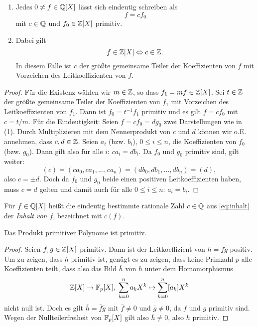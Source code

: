 \documentclass{book}
\begin{document}
\begin{lem}
    \label{lem:inhalt}
    \begin{enumerate}
        \item Jedes $0 \ne f \in \mathbb{Q}[X]$ lässt sich eindeutig schreiben als
                \begin{equation}
                    \label{eq:inhalt}
                    f = c f_0
                \end{equation}
            mit $c \in \mathbb{Q}$ und $f_0 \in \mathbb{Z}[X]$ primitiv. 
        \item Dabei gilt
            \[
                f \in \mathbb{Z}[X] \Leftrightarrow c \in \mathbb{Z}. 
            \]
            In diesem Falle ist $c$ der größte gemeinsame Teiler der
            Koeffizienten von $f$ mit Vorzeichen des Leitkoeffizienten von $f$.
    \end{enumerate}
\end{lem}
\begin{proof}
    Für die Existenz wählen wir $m \in \mathbb{Z}$, so dass $f_1 = m f \in \mathbb{Z}[X]$. Sei
    $t \in \mathbb{Z}$ der größte gemeinsame Teiler der Koeffizienten von $f_1$ mit
    Vorzeichen des Leitkoeffizienten von $f_1$. Dann ist $f_0 = t^{-1} f_1$
    primitiv und es gilt $f = c f_0$ mit $c = t/m$. 
    Für die Eindeutigkeit: Seien $f = c f_0 = d g_0$ zwei Darstellungen wie in
    (1). Durch Multiplizieren mit dem Nennerprodukt von $c$ und $d$ können wir
    o.E. annehmen, dass $c,d \in \mathbb{Z}$. Seien $a_i$ (bzw. $b_i$), $0 \le i \le n$, die
    Koeffizienten von $f_0$ (bzw. $g_0$). Dann gilt also für alle $i$: $c a_i =
    d b_i$. Da $f_0$ und $g_0$ primitiv sind, gilt weiter:
    \[
        ( c ) = (ca_0,ca_1, ..., ca_n) = (db_0,db_1, ..., db_n) = ( d),
    \]
    also $c = \pm d$. Doch da $f_0$ und $g_0$ beide einen positiven
    Leitkoeffizienten haben, muss $c = d$ gelten und damit auch für alle $0 \le
    i \le n$: $a_i = b_i$.
\end{proof}

\begin{term}
    \label{term:inhalt}
    Für $f \in \mathbb{Q}[X]$ heißt die eindeutig bestimmte rationale Zahl $c
    \in \mathbb{Q}$ aus \eqref{eq:inhalt} der \emph{Inhalt von $f$}, bezeichnet mit
    $c(f)$. 
\end{term}

\begin{lem}
    \label{lem:gauß}
    Das Produkt primitiver Polynome ist primitiv. 
\end{lem}
\begin{proof}
    Seien $f,g \in \mathbb{Z}[X]$ primitiv. Dann ist der Leitkoeffizient von $h = fg$
    positiv. Um zu zeigen, dass $h$ primitiv ist, genügt es zu zeigen, dass
    keine Primzahl $p$ alle Koeffizienten teilt, dass also das Bild $\overline{h}$ von $h$ 
    unter dem Homomorphismus 
    \[
        \mathbb{Z}[X] \to \mathbb{F}_p[X],\; \sum_{k=0}^n a_k X^k \mapsto \sum_{k=0}^n [ a_k ] X^k
    \]
    nicht null ist. Doch es gilt $\overline{h} = \overline{f}\overline{g}$ mit
    $\overline{f} \ne 0$ und $\overline{g} \ne 0$, da $f$ und $g$ primitiv
    sind. Wegen der Nullteilerfreiheit von $\mathbb{F}_p[X]$ gilt also $\overline{h}
    \ne 0$, also $h$ primitiv. 
\end{proof}
\end{document}
